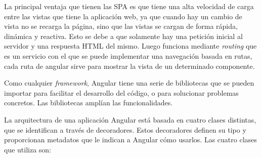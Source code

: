 \documentclass[a4paper, 12pt]{book}
\begin{document}
La principal ventaja que tienen las SPA es que tiene una alta velocidad de carga entre las vistas que tiene la aplicación web, ya que cuando hay un cambio de vista no se recarga la página, sino que las vistas se cargan de forma rápida, dinámica y reactiva. 
Esto se debe a que solamente hay una petición inicial al servidor y una respuesta HTML del mismo. Luego funciona mediante \emph{routing} que es un servicio con el que se puede implementar una navegación basada en rutas, cada ruta de angular sirve para mostrar la vista de un determinado componente.

Como cualquier \emph{framework}, Angular tiene una serie de bibliotecas que se pueden importar para facilitar el desarrollo del código, o para solucionar problemas concretos. 
Las bibliotecas amplían las funcionalidades.

La arquitectura de una aplicación Angular está basada en cuatro clases distintas, que se identifican a través de decoradores. 
Estos decoradores definen su tipo y proporcionan metadatos que le indican a Angular cómo usarlos.
Las cuatro clases que utiliza son:
\end{document}
